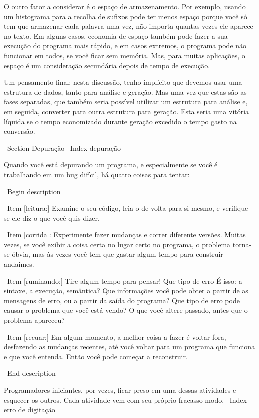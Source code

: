 \documentclass[10pt]{book}
\begin{document}
{{{{{{{{{{O outro fator a considerar é o espaço de armazenamento. Por exemplo, usando um
histograma para a recolha de sufixos pode ter menos espaço porque
você só tem que armazenar cada palavra uma vez, não importa quantas vezes ele
aparece no texto. Em alguns casos, economia de espaço também pode fazer a sua
execução do programa mais rápido, e em casos extremos, o programa pode não funcionar em
todos, se você ficar sem memória. Mas, para muitas aplicações, o espaço é um
consideração secundária depois de tempo de execução.

Um pensamento final: nesta discussão, tenho implícito que
devemos usar uma estrutura de dados, tanto para análise e geração. Mas
uma vez que estas são as fases separadas, que também seria possível utilizar um
estrutura para análise e, em seguida, converter para outra estrutura para
geração. Esta seria uma vitória líquida se o tempo economizado durante
geração excedido o tempo gasto na conversão.


\ Section {} Depuração
\ Index {depuração}

Quando você está depurando um programa, e especialmente se você é
trabalhando em um bug difícil, há quatro coisas para tentar:

\ Begin {description}

\ Item [leitura:] Examine o seu código, leia-o de volta para si mesmo, e
verifique se ele diz o que você quis dizer.

\ Item [corrida]: Experimente fazer mudanças e correr diferente
versões. Muitas vezes, se você exibir a coisa certa no lugar certo
no programa, o problema torna-se óbvia, mas às vezes você tem que
gastar algum tempo para construir andaimes.

\ Item [ruminando:] Tire algum tempo para pensar! Que tipo de erro
É isso: a sintaxe, a execução, semântica? Que informações você pode obter a partir de
as mensagens de erro, ou a partir da saída do programa? Que tipo de
erro pode causar o problema que você está vendo? O que você altere
passado, antes que o problema apareceu?

\ Item [recuar:] Em algum momento, a melhor coisa a fazer é voltar
fora, desfazendo as mudanças recentes, até você voltar para um programa que
funciona e que você entenda. Então você pode começar a reconstruir.

\ End {description}

Programadores iniciantes, por vezes, ficar preso em uma dessas atividades
e esquecer os outros. Cada atividade vem com seu próprio fracasso
modo.
\ Index {erro de digitação}

}}}}}}}}}}
\end{document}
